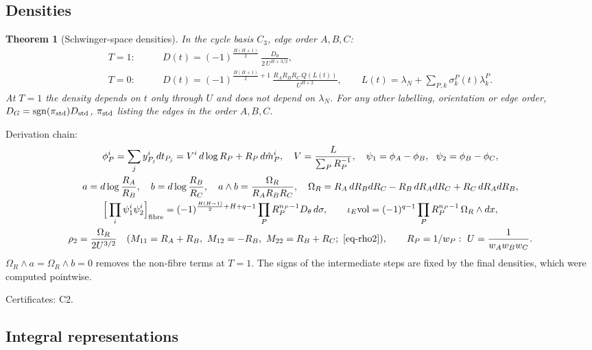 \documentclass[10pt,a4paper]{article}
\numberwithin{equation}{section}
\newtheorem{theorem}{Theorem}[section]
\theoremstyle{definition}
\theoremstyle{remark}
\newcommand{\sgn}{\operatorname{sgn}}
\newcommand{\cert}[1]{\par\noindent\textup{Certificates: #1.}\par}
\begin{document}
\subsection{Densities}

\begin{theorem}[Schwinger-space densities]\label{thm-dens}
In the cycle basis $C_3$, edge order $A,B,C$:
\begin{align}
T=1:&\qquad D(t)=(-1)^{\frac{H(H+1)}2}\,\frac{D_\theta}{2\,U^{H+3/2}},\\
T=0:&\qquad D(t)=(-1)^{\frac{H(H+1)}2+1}\,\frac{R_AR_BR_C\,Q(L(t))}{U^{H+2}},\qquad L(t)=\lambda_N+\sum_{P,k}\sigma^P_k(t)\lambda^P_k .
\end{align}
At $T=1$ the density depends on $t$ only through $U$ and does not depend on $\lambda_N$. For any other labelling, orientation or edge order, $D_G=\sgn(\pi_{\rm std})D_{\rm std}$, $\pi_{\rm std}$ listing the edges in the order $A,B,C$.
\end{theorem}
Derivation chain:
\begin{gather}
\phi^i_P=\sum_jy^i_{P_j}dt_{P_j}=V^i\,d\log R_P+R_P\,d\hat m^i_P,\quad V=\frac{L}{\sum_PR_P^{-1}},\quad \psi_1=\phi_A-\phi_B,\ \ \psi_2=\phi_B-\phi_C,\\
a=d\log\frac{R_A}{R_B},\quad b=d\log\frac{R_B}{R_C},\quad a\wedge b=\frac{\Omega_R}{R_AR_BR_C},\quad \Omega_R=R_A\,dR_BdR_C-R_B\,dR_AdR_C+R_C\,dR_AdR_B,\\
\Big[\prod_i\psi^i_1\psi^i_2\Big]_{\rm fibre}=(-1)^{\frac{H(H-1)}2+H+q-1}\prod_PR_P^{n_P-1}D_\theta\,d\sigma,\qquad
\iota_E{\rm vol}=(-1)^{q-1}\prod_PR_P^{n_P-1}\,\Omega_R\wedge dx,\\
\rho_2=\frac{\Omega_R}{2U^{3/2}}\quad(M_{11}=R_A+R_B,\ M_{12}=-R_B,\ M_{22}=R_B+R_C;\ \eqref{eq-rho2}),\qquad R_P=1/w_P:\ U=\frac1{w_Aw_Bw_C}.
\end{gather}
$\Omega_R\wedge a=\Omega_R\wedge b=0$ removes the non-fibre terms at $T=1$. The signs of the intermediate steps are fixed by the final densities, which were computed pointwise.
\cert{C2}

\subsection{Integral representations}
\end{document}
